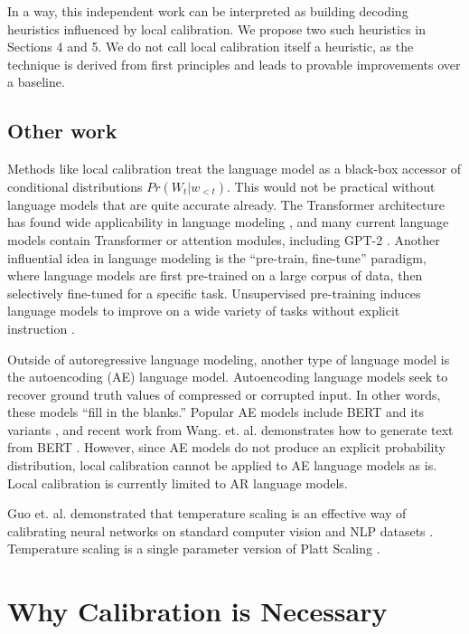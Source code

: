 \documentclass[pageno]{jpaper}
\begin{document}
In a way, this independent work can be interpreted as building decoding heuristics influenced by local calibration. We propose two such heuristics in Sections 4 and 5. We do not call local calibration itself a heuristic, as the technique is derived from first principles and leads to provable improvements over a baseline.

\subsection{Other work}

Methods like local calibration treat the language model as a black-box accessor of conditional distributions $Pr(W_t|w_{<t})$. This would not be practical without language models that are quite accurate already. The Transformer architecture has found wide applicability in language modeling \cite{attention17}, and many current language models contain Transformer or attention modules, including GPT-2 \cite{BERT,radford2019language,XLNet,transformer-xl}. Another influential idea in language modeling is the ``pre-train, fine-tune'' paradigm, where language models are first pre-trained on a large corpus of data, then selectively fine-tuned for a specific task. Unsupervised pre-training induces language models to improve on a wide variety of tasks without explicit instruction \cite{Radford2018ImprovingLU}.

Outside of autoregressive language modeling, another type of language model is the autoencoding (AE) language model. Autoencoding language models seek to recover ground truth values of compressed or corrupted input. In other words, these models ``fill in the blanks.'' Popular AE models include BERT and its variants \cite{BERT}, and recent work from Wang. et. al. demonstrates how to generate text from BERT \cite{BERTMouth}. However, since AE models do not produce an explicit probability distribution, local calibration cannot be applied to AE language models as is. Local calibration is currently limited to AR language models.

Guo et. al. demonstrated that temperature scaling is an effective way of calibrating neural networks on standard computer vision and NLP datasets \cite{guoTempCalibration}. Temperature scaling is a single parameter version of Platt Scaling \cite{platt99}. 

\section{Why Calibration is Necessary}
\end{document}
